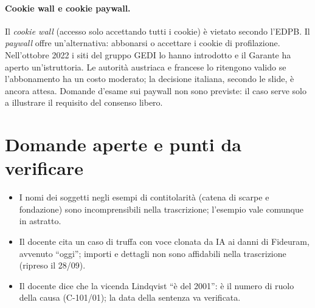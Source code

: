 \paragraph{Cookie wall e cookie paywall.} Il \emph{cookie wall} (accesso solo accettando tutti i
cookie) è vietato secondo l'EDPB. Il \emph{paywall} offre un'alternativa: abbonarsi o accettare i
cookie di profilazione. Nell'ottobre 2022 i siti del gruppo GEDI lo hanno introdotto e il Garante ha
aperto un'istruttoria. Le autorità austriaca e francese lo ritengono valido se l'abbonamento ha un
costo moderato; la decisione italiana, secondo le slide, è ancora attesa. Domande d'esame sui
paywall non sono previste: il caso serve solo a illustrare il requisito del consenso libero.

\section{Domande aperte e punti da verificare}
\begin{verifica}
\begin{itemize}
  \item I nomi dei soggetti negli esempi di contitolarità (catena di scarpe e fondazione) sono
    incomprensibili nella trascrizione; l'esempio vale comunque in astratto.
  \item Il docente cita un caso di truffa con voce clonata da IA ai danni di Fideuram, avvenuto ``oggi'';
    importi e dettagli non sono affidabili nella trascrizione (ripreso il 28/09).
  \item Il docente dice che la vicenda Lindqvist ``è del 2001'': è il numero di ruolo della causa
    (C-101/01); la data della sentenza va verificata.
\end{itemize}
\end{verifica}
